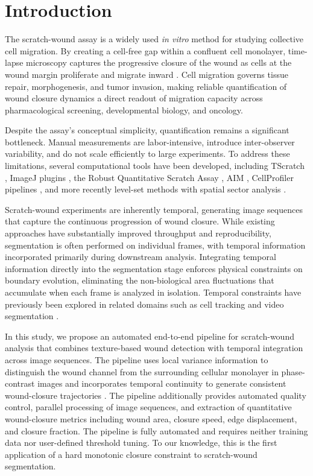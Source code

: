 \section{Introduction}

The scratch-wound assay is a widely used \emph{in vitro} method for studying collective cell migration. By creating a cell-free gap within a confluent cell monolayer, time-lapse microscopy captures the progressive closure of the wound as cells at the wound margin proliferate and migrate inward \citep{Liang2007,Jonkman2014,Grada2017,Yarrow2004,Ashby2012,Pinto2023,Stamm2016}. Cell migration governs tissue repair, morphogenesis, and tumor invasion, making reliable quantification of wound closure dynamics a direct readout of migration capacity across pharmacological screening, developmental biology, and oncology.

Despite the assay's conceptual simplicity, quantification remains a significant bottleneck. Manual measurements are labor-intensive, introduce inter-observer variability, and do not scale efficiently to large experiments. To address these limitations, several computational tools have been developed, including TScratch \citep{Gebaeck2009}, ImageJ plugins \citep{Suarez2020}, the Robust Quantitative Scratch Assay \citep{Vargas2016}, AIM \citep{Nunes2017}, CellProfiler pipelines \citep{McQuin2018}, and more recently level-set methods with spatial sector analysis \citep{Martinotti2025}.

Scratch-wound experiments are inherently temporal, generating image sequences that capture the continuous progression of wound closure. While existing approaches have substantially improved throughput and reproducibility, segmentation is often performed on individual frames, with temporal information incorporated primarily during downstream analysis. Integrating temporal information directly into the segmentation stage enforces physical constraints on boundary evolution, eliminating the non-biological area fluctuations that accumulate when each frame is analyzed in isolation. Temporal constraints have previously been explored in related domains such as cell tracking \citep{Bragantini2025,Lee2023,Li2008} and video segmentation \citep{Guan2021}.

In this study, we propose an automated end-to-end pipeline for scratch-wound analysis that combines texture-based wound detection with temporal integration across image sequences. The pipeline uses local variance information to distinguish the wound channel from the surrounding cellular monolayer in phase-contrast images and incorporates temporal continuity to generate consistent wound-closure trajectories \citep{Yin2012,Treloar2013}. The pipeline additionally provides automated quality control, parallel processing of image sequences, and extraction of quantitative wound-closure metrics including wound area, closure speed, edge displacement, and closure fraction. The pipeline is fully automated and requires neither training data nor user-defined threshold tuning. To our knowledge, this is the first application of a hard monotonic closure constraint to scratch-wound segmentation.

